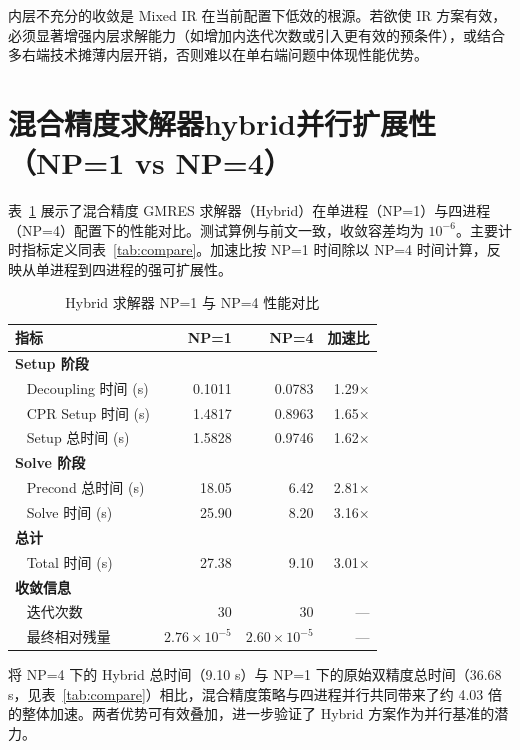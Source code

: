 \documentclass[12pt,a4paper]{article}
\begin{document}
    内层不充分的收敛是 Mixed IR 在当前配置下低效的根源。若欲使 IR 方案有效，必须显著增强内层求解能力（如增加内迭代次数或引入更有效的预条件），或结合多右端技术摊薄内层开销，否则难以在单右端问题中体现性能优势。

    \newpage

    \section{混合精度求解器hybrid并行扩展性（NP=1 vs NP=4）}

    表~\ref{tab:hybrid_scaling} 展示了混合精度 GMRES 求解器（Hybrid）在单进程（NP=1）与四进程（NP=4）配置下的性能对比。测试算例与前文一致，收敛容差均为 $10^{-6}$。主要计时指标定义同表~\ref{tab:compare}。加速比按 NP=1 时间除以 NP=4 时间计算，反映从单进程到四进程的强可扩展性。

\begin{table}[htbp]
\centering
\caption{Hybrid 求解器 NP=1 与 NP=4 性能对比}
\label{tab:hybrid_scaling}
\begin{tabular}{lrrr}
\toprule
指标 & NP=1 & NP=4 & 加速比 \\
\midrule
\textbf{Setup 阶段} \\
~ Decoupling 时间 (s) & 0.1011 & 0.0783 & 1.29$\times$ \\
~ CPR Setup 时间 (s)  & 1.4817 & 0.8963 & 1.65$\times$ \\
~ Setup 总时间 (s)    & 1.5828 & 0.9746 & 1.62$\times$ \\
\midrule
\textbf{Solve 阶段} \\
~ Precond 总时间 (s)  & 18.05  & 6.42   & 2.81$\times$ \\
~ Solve 时间 (s)      & 25.90  & 8.20   & 3.16$\times$ \\
\midrule
\textbf{总计} \\
~ Total 时间 (s)      & 27.38  & 9.10   & 3.01$\times$ \\
\midrule
\textbf{收敛信息} \\
~ 迭代次数            & 30     & 30     & --- \\
~ 最终相对残量        & $2.76\times10^{-5}$ & $2.60\times10^{-5}$ & --- \\
\bottomrule
\end{tabular}
\end{table}

将 NP=4 下的 Hybrid 总时间（9.10 s）与 NP=1 下的原始双精度总时间（36.68 s，见表~\ref{tab:compare}）相比，混合精度策略与四进程并行共同带来了约 4.03 倍的整体加速。两者优势可有效叠加，进一步验证了 Hybrid 方案作为并行基准的潜力。
\end{document}
